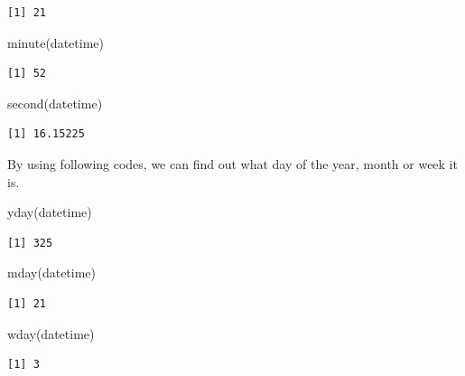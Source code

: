 \documentclass[
  letterpaper,
  DIV=11,
  numbers=noendperiod]{scrartcl}
\newenvironment{Shaded}{\begin{snugshade}}{\end{snugshade}}
\newcommand{\FunctionTok}[1]{\textcolor[rgb]{0.28,0.35,0.67}{#1}}
\newcommand{\NormalTok}[1]{\textcolor[rgb]{0.00,0.23,0.31}{#1}}
\begin{document}
\begin{verbatim}
[1] 21
\end{verbatim}

\begin{Shaded}
\begin{Highlighting}[]
\FunctionTok{minute}\NormalTok{(datetime) }
\end{Highlighting}
\end{Shaded}

\begin{verbatim}
[1] 52
\end{verbatim}

\begin{Shaded}
\begin{Highlighting}[]
\FunctionTok{second}\NormalTok{(datetime)}
\end{Highlighting}
\end{Shaded}

\begin{verbatim}
[1] 16.15225
\end{verbatim}

By using following codes, we can find out what day of the year, month or
week it is.

\begin{Shaded}
\begin{Highlighting}[]
\FunctionTok{yday}\NormalTok{(datetime)  }
\end{Highlighting}
\end{Shaded}

\begin{verbatim}
[1] 325
\end{verbatim}

\begin{Shaded}
\begin{Highlighting}[]
\FunctionTok{mday}\NormalTok{(datetime) }
\end{Highlighting}
\end{Shaded}

\begin{verbatim}
[1] 21
\end{verbatim}

\begin{Shaded}
\begin{Highlighting}[]
\FunctionTok{wday}\NormalTok{(datetime) }
\end{Highlighting}
\end{Shaded}

\begin{verbatim}
[1] 3
\end{verbatim}
\end{document}

